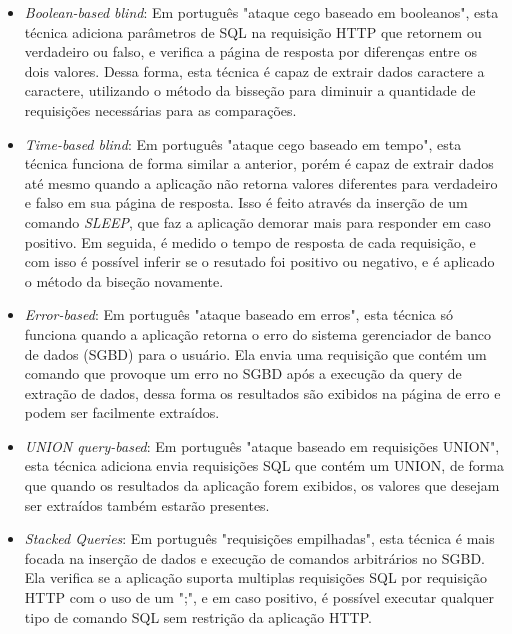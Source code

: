     \label{item:sqlmap}
    \begin{itemize}
        \item \emph{Boolean-based blind}: Em português "ataque cego baseado em booleanos", esta técnica adiciona parâmetros de SQL na requisição HTTP que retornem ou verdadeiro ou falso, e verifica a página de resposta por diferenças entre os dois valores. Dessa forma, esta técnica é capaz de extrair dados caractere a caractere, utilizando o método da bisseção para diminuir a quantidade de requisições necessárias para as comparações.
        
        \item \emph{Time-based blind}: Em português "ataque cego baseado em tempo", esta técnica funciona de forma similar a anterior, porém é capaz de extrair dados até mesmo quando a aplicação não retorna valores diferentes para verdadeiro e falso em sua página de resposta. Isso é feito através da inserção de um comando \textit{SLEEP}, que faz a aplicação demorar mais para responder em caso positivo. Em seguida, é medido o tempo de resposta de cada requisição, e com isso é possível inferir se o resutado foi positivo ou negativo, e é aplicado o método da biseção novamente.
        
        \item \emph{Error-based}: Em português "ataque baseado em erros", esta técnica só funciona quando a aplicação retorna o erro do sistema gerenciador de banco de dados (SGBD) para o usuário. Ela envia uma requisição que contém um comando que provoque um erro no SGBD após a execução da query de extração de dados, dessa forma os resultados são exibidos na página de erro e podem ser facilmente extraídos.
        
        \item \emph{UNION query-based}: Em português "ataque baseado em requisições UNION", esta técnica adiciona envia requisições SQL que contém um UNION, de forma que quando os resultados da aplicação forem exibidos, os valores que desejam ser extraídos também estarão presentes. 
        
        \item \emph{Stacked Queries}: Em português "requisições empilhadas", esta técnica é mais focada na inserção de dados e execução de comandos arbitrários no SGBD. Ela verifica se a aplicação suporta multiplas requisições SQL por requisição HTTP com o uso de um ";", e em caso positivo, é possível executar qualquer tipo de comando SQL sem restrição da aplicação HTTP.
    \end{itemize}
    
